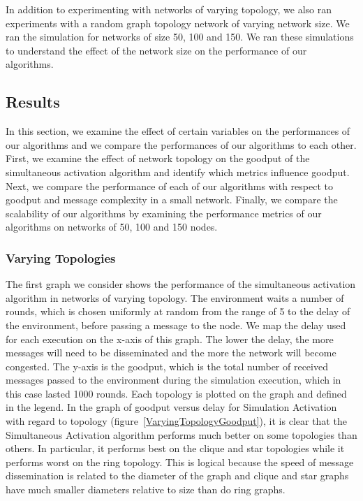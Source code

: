 \documentclass[english]{article}
\begin{document}
In addition to experimenting with networks of varying topology, we also ran experiments with a random graph topology network of varying network size. We ran the simulation for networks of size 50, 100 and 150. We ran these simulations to understand the effect of the network size on the performance of our algorithms.


\subsection{Results}

In this section, we examine the effect of certain variables on the performances of our algorithms and we compare the performances of our algorithms to each other. First, we examine the effect of network topology on the goodput of the simultaneous activation algorithm and identify which metrics influence goodput. Next, we compare the performance of each of our algorithms with respect to goodput and message complexity in a small network. Finally, we compare the scalability of our algorithms by examining the performance metrics of our algorithms on networks of 50, 100 and 150 nodes.

\subsubsection{Varying Topologies}

The first graph we consider shows the performance of the simultaneous activation algorithm in networks of varying topology. The environment waits a number of rounds, which is chosen uniformly at random from the range of 5 to the delay of the environment, before passing a message to the node. We map the delay used for each execution on the x-axis of this graph. The lower the delay, the more messages will need to be disseminated and the more the network will become congested. The y-axis is the goodput, which is the total number of received messages passed to the environment during the simulation execution, which in this case lasted 1000 rounds. Each topology is plotted on the graph and defined in the legend. In the graph of goodput versus delay for Simulation Activation with regard to topology (figure~\ref{VaryingTopologyGoodput}), it is clear that the Simultaneous Activation algorithm performs much better on some topologies than others. In particular, it performs best on the clique and star topologies while it performs worst on the ring topology. This is logical because the speed of message dissemination is related to the diameter of the graph and clique and star graphs have much smaller diameters relative to size than do ring graphs.
\end{document}
